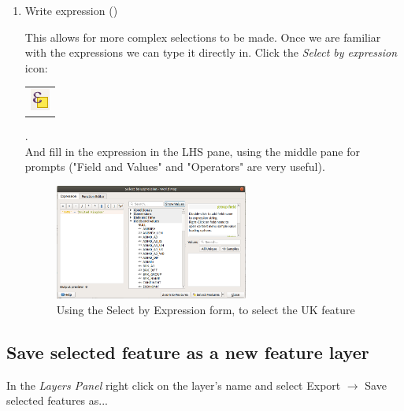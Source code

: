 \begin{enumerate}
	\item 
	Write expression ()
	
	This allows for more complex selections to be made. Once we are familiar with the expressions we can type it directly in. Click the \textit{Select by expression} icon: 
	\begin{tabular}{@{}c@{}}\includegraphics[width=4ex]{images/select_by_expression_icon.png}\end{tabular}.\\
	
	And fill in the expression in the LHS pane, using the middle pane for prompts ("Field and Values" and "Operators" are very useful).
	
	\begin{figure}[!h]
		\centering
		\includegraphics[width=0.6\textwidth]{images/select_by_expression_form_uk.png}
		\caption{Using the Select by Expression form, to select the UK feature}
		\label{ft_fig_firstfig3}
	\end{figure}
	
	
\end{enumerate}





\null\newpage
\subsection{Save selected feature as a new feature layer}
In the \textit{Layers Panel} right click on the layer's name and select Export $\rightarrow$ Save selected features as...\\

